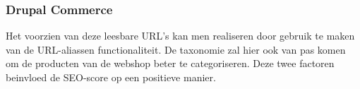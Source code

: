 \subsubsection{Drupal Commerce}
Het voorzien van deze leesbare URL's kan men realiseren door gebruik te maken van de URL-aliassen functionaliteit. De taxonomie zal hier ook van pas komen om de producten van de webshop beter te categoriseren. Deze twee factoren beinvloed de SEO-score op een positieve manier.
